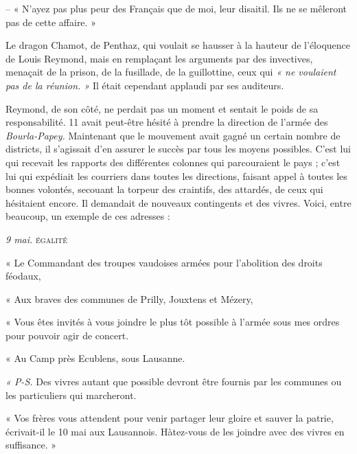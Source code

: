 \documentclass[french,twoside]{book} %
\newenvironment{quoteblock}%
  {\begin{quoting}}
  {\end{quoting}}
\newenvironment{quotebar}{%
    \def\FrameCommand{{\color{rubric!10!}\vrule width 0.5em} \hspace{0.9em}}%
    \def\OuterFrameSep{\itemsep} %
    \MakeFramed {\advance\hsize-\width \FrameRestore}
  }%
  {%
    \endMakeFramed
  }
\renewenvironment{quoteblock}%
  {%
    \savenotes
    \setstretch{0.9}
    \begin{quotebar}
  }
  {%
    \end{quotebar}
    \spewnotes
  }
\begin{document}
\begin{quoteblock}
\noindent – « N’ayez pas plus peur des Français que de moi, leur disaitil. Ils ne se mêleront pas de cette affaire. »\end{quoteblock}

\noindent Le dragon Chamot, de Penthaz, qui voulait se hausser à la hauteur de l’éloquence de Louis Reymond, mais en remplaçant les arguments par des invectives, menaçait de la prison, de la fusillade, de la guillottine, ceux qui \emph{« ne voulaient pas de la réunion. »} Il était cependant applaudi par ses auditeurs.\par
Reymond, de son côté, ne perdait pas un moment et sentait le poids de sa responsabilité. 11 avait peut-être hésité à prendre la direction de l’armée des \emph{Bourla-Papey.} Maintenant que le mouvement avait gagné un certain nombre de districts, il s’agissait d’en assurer le succès par tous les moyens possibles. C’est lui qui recevait les rapports des différentes colonnes qui parcouraient le pays ; c’est lui qui expédiait les courriers dans toutes les directions, faisant appel à toutes les bonnes volontés, secouant la torpeur des craintifs, des attardés, de ceux qui hésitaient encore. Il demandait de nouveaux contingents et des vivres. Voici, entre beaucoup, un exemple de ces adresses :\par

\begin{quoteblock}
  \emph{9 mai.} {\scshape égalité}\par
 « Le Commandant des troupes vaudoises armées pour l’abolition des droits féodaux,\par
 « Aux braves des communes de Prilly, Jouxtens et Mézery,\par
 « Vous êtes invités à vous joindre le plus tôt possible à l’armée sous mes ordres pour pouvoir agir de concert.\par
 « Au Camp près Ecublens, sous Lausanne.\par
 \emph{« P-S.} Des vivres autant que possible devront être fournis par les communes ou les particuliers qui marcheront.\par
 « Vos frères vous attendent pour venir partager leur gloire et sauver la patrie, écrivait-il le 10 mai aux Lausannois. Hàtez-vous de les joindre avec des vivres en suffisance. »
 \end{quoteblock}
\end{document}
